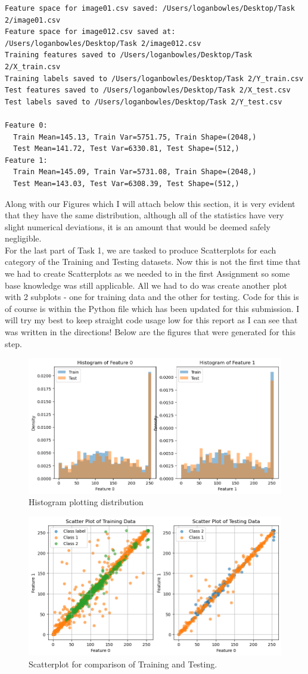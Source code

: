 \documentclass[conference]{IEEEtran} %
\begin{document}
\begin{lstlisting}
Feature space for image01.csv saved: /Users/loganbowles/Desktop/Task 2/image01.csv
Feature space for image012.csv saved at: /Users/loganbowles/Desktop/Task 2/image012.csv
Training features saved to /Users/loganbowles/Desktop/Task 2/X_train.csv
Training labels saved to /Users/loganbowles/Desktop/Task 2/Y_train.csv
Test features saved to /Users/loganbowles/Desktop/Task 2/X_test.csv
Test labels saved to /Users/loganbowles/Desktop/Task 2/Y_test.csv

Feature 0:
  Train Mean=145.13, Train Var=5751.75, Train Shape=(2048,)
  Test Mean=141.72, Test Var=6330.81, Test Shape=(512,)
Feature 1:
  Train Mean=145.09, Train Var=5731.08, Train Shape=(2048,)
  Test Mean=143.03, Test Var=6308.39, Test Shape=(512,)
\end{lstlisting}
Along with our Figures which I will attach below this section, it is very evident that they have the same distribution, although all of the statistics have very slight numerical deviations, it is an amount that would be deemed safely negligible. \\
For the last part of Task 1, we are tasked to produce Scatterplots for each category of the Training and Testing datasets.  Now this is not the first time that we had to create Scatterplots as we needed to in the first Assignment so some base knowledge was still applicable.  All we had to do was create another plot with 2 subplots - one for training data and the other for testing.  Code for this is of course is within the Python file which has been updated for this submission.  I will try my best to keep straight code usage low for this report as I can see that was written in the directions!  Below are the figures that were generated for this step.

\begin{figure}[H]
    \centering
    \includegraphics[width=0.5\linewidth]{Part11.png}
    \caption{Histogram plotting distribution}
    \label{fig:histogram1}
\end{figure}

\begin{figure}[H]
    \centering
    \includegraphics[width=0.5\linewidth]{Part12.png}
    \caption{Scatterplot for comparison of Training and Testing.}
    \label{fig:histogram1}
\end{figure}
\end{document}
